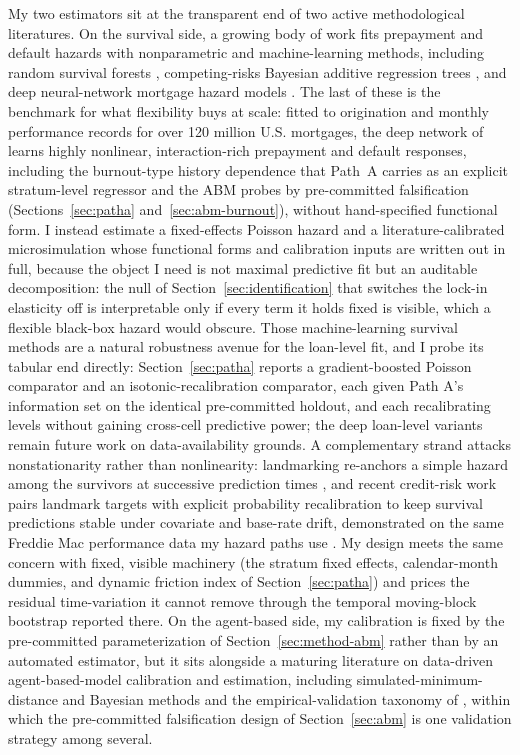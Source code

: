 \documentclass[12pt]{article}
\begin{document}
My two estimators sit at the transparent end of two active methodological literatures. On the survival side, a growing body of work fits prepayment and default hazards with nonparametric and machine-learning methods, including random survival forests \citep{ishwaran2008}, competing-risks Bayesian additive regression trees \citep{sparapani2020}, and deep neural-network mortgage hazard models \citep{sadhwani2021}. The last of these is the benchmark for what flexibility buys at scale: fitted to origination and monthly performance records for over 120 million U.S. mortgages, the deep network of \citet{sadhwani2021} learns highly nonlinear, interaction-rich prepayment and default responses, including the burnout-type history dependence that Path~A carries as an explicit stratum-level regressor and the ABM probes by pre-committed falsification (Sections~\ref{sec:patha} and~\ref{sec:abm-burnout}), without hand-specified functional form. I instead estimate a fixed-effects Poisson hazard and a literature-calibrated microsimulation whose functional forms and calibration inputs are written out in full, because the object I need is not maximal predictive fit but an auditable decomposition: the null of Section~\ref{sec:identification} that switches the lock-in elasticity off is interpretable only if every term it holds fixed is visible, which a flexible black-box hazard would obscure. Those machine-learning survival methods are a natural robustness avenue for the loan-level fit, and I probe its tabular end directly: Section~\ref{sec:patha} reports a gradient-boosted Poisson comparator and an isotonic-recalibration comparator, each given Path A's information set on the identical pre-committed holdout, and each recalibrating levels without gaining cross-cell predictive power; the deep loan-level variants remain future work on data-availability grounds. A complementary strand attacks nonstationarity rather than nonlinearity: landmarking re-anchors a simple hazard among the survivors at successive prediction times \citep{vanhouwelingen2007,putter2022}, and recent credit-risk work pairs landmark targets with explicit probability recalibration to keep survival predictions stable under covariate and base-rate drift, demonstrated on the same Freddie Mac performance data my hazard paths use \citep{peng2026}. My design meets the same concern with fixed, visible machinery (the stratum fixed effects, calendar-month dummies, and dynamic friction index of Section~\ref{sec:patha}) and prices the residual time-variation it cannot remove through the temporal moving-block bootstrap reported there. On the agent-based side, my calibration is fixed by the pre-committed parameterization of Section~\ref{sec:method-abm} rather than by an automated estimator, but it sits alongside a maturing literature on data-driven agent-based-model calibration and estimation, including simulated-minimum-distance and Bayesian methods \citep{grazzini2017,platt2020} and the empirical-validation taxonomy of \citet{fagiolo2007}, within which the pre-committed falsification design of Section~\ref{sec:abm} is one validation strategy among several.
\end{document}
